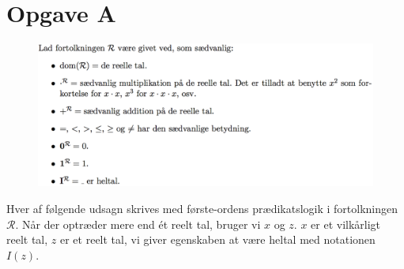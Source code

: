 \section*{Opgave A}

\begin{figure}[H]
    \centering
    \includegraphics[width=1.0\textwidth]{opgA/opgA.png}
    \label{fig:opgA}
\end{figure}

Hver af følgende udsagn skrives med første-ordens prædikatslogik i fortolkningen $\mathcal{R}$. Når der optræder mere end ét reelt tal, bruger vi $x$ og $z$. $x$ er et vilkårligt reelt tal, $z$ er et reelt tal, vi giver egenskaben at være heltal med notationen $I(z)$. 

